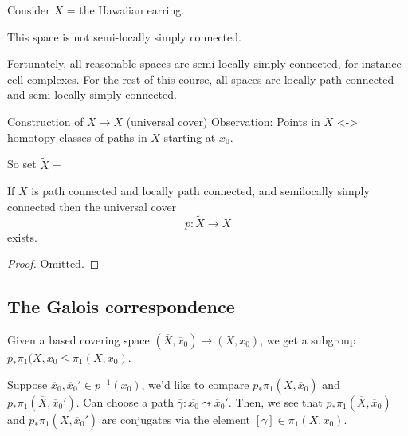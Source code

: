 \documentclass{article}
\numberwithin{nthm}{subsection}
\begin{document}
\begin{eg}
    Consider $X$ = the Hawaiian earring.
    \begin{center}
    \end{center}
    This space is not semi-locally simply connected. %
\end{eg}

Fortunately, all reasonable spaces are semi-locally simply connected, for instance cell complexes. For the rest of this course, all spaces are locally path-connected and semi-locally simply connected.

Construction of $\widetilde{X} \to X$ (universal cover)
Observation: Points in $\widetilde{X}$ <-> homotopy classes of paths in $X$ starting at $x_0$.

So set $\widetilde{X} = $

\begin{thm}
    If $X$ is path connected and locally path connected, and semilocally simply connected then the universal cover
    \begin{equation*}
        p: \widetilde{X} \to X
    \end{equation*}
    exists.
\end{thm}

\begin{proof}
    Omitted.
\end{proof}

\subsection{The Galois correspondence}
Given a based covering space $(\overline{X}, \overline{x}_0) \to (X, x_0)$, we get a subgroup $p_* \pi_1(\overline{X}, \overline{x}_0 \leq \pi_1(X, x_0)$.

Suppose $\overline{x}_0, \overline{x}_0' \in p^{-1} (x_0)$, we'd like to compare $p_* \pi_1 (\overline{X}, \overline{x}_0)$ and $p_* \pi_1 (\overline{X}, \overline{x}_0')$.
Can choose a path $\overline{\gamma} : \overline{x_0} \leadsto \overline{x}_0'$. Then, we see that $p_* \pi_1 (\overline{X}, \overline{x}_0)$ and $p_* \pi_1 (\overline{X}, \overline{x}_0')$ are conjugates via the element $[\gamma] \in \pi_1(X, x_0)$.
\end{document}
